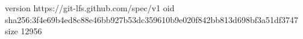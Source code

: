 version https://git-lfs.github.com/spec/v1
oid sha256:3f4e69b4ed8c88e46bb927b53dc359610b9e020f842bb813d698bf3a51df3747
size 12956
